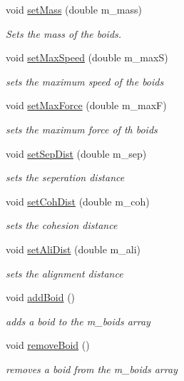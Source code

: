 \begin{DoxyCompactItemize}
\item 
void \hyperlink{classBoidManager_a68e8db68ff75e9d85f6dcba93034d2cb}{setMass} (double m\_\-mass)
\begin{DoxyCompactList}\small\item\em Sets the mass of the boids. \end{DoxyCompactList}\item 
void \hyperlink{classBoidManager_af6fde83bd957cf0670a6e35224806f16}{setMaxSpeed} (double m\_\-maxS)
\begin{DoxyCompactList}\small\item\em sets the maximum speed of the boids \end{DoxyCompactList}\item 
void \hyperlink{classBoidManager_ab7bc38a47f17a7c3250d7ee9eaa5bd3f}{setMaxForce} (double m\_\-maxF)
\begin{DoxyCompactList}\small\item\em sets the maximum force of th boids \end{DoxyCompactList}\item 
void \hyperlink{classBoidManager_a23eb2208fa6240f9cdf1b13991be2bc5}{setSepDist} (double m\_\-sep)
\begin{DoxyCompactList}\small\item\em sets the seperation distance \end{DoxyCompactList}\item 
void \hyperlink{classBoidManager_a6cfe58d32d79898a5a0b1242533997bd}{setCohDist} (double m\_\-coh)
\begin{DoxyCompactList}\small\item\em sets the cohesion distance \end{DoxyCompactList}\item 
void \hyperlink{classBoidManager_af81a32c698d1691ef0702d82aa285dbd}{setAliDist} (double m\_\-ali)
\begin{DoxyCompactList}\small\item\em sets the alignment distance \end{DoxyCompactList}\item 
\hypertarget{classBoidManager_a7b78aab8b8ffa6b4c6c2553cc67c4e1e}{
void \hyperlink{classBoidManager_a7b78aab8b8ffa6b4c6c2553cc67c4e1e}{addBoid} ()}
\label{classBoidManager_a7b78aab8b8ffa6b4c6c2553cc67c4e1e}

\begin{DoxyCompactList}\small\item\em adds a boid to the m\_\-boids array \end{DoxyCompactList}\item 
\hypertarget{classBoidManager_a7357bfaa9a4fdce0ac929504f5b11cb9}{
void \hyperlink{classBoidManager_a7357bfaa9a4fdce0ac929504f5b11cb9}{removeBoid} ()}
\label{classBoidManager_a7357bfaa9a4fdce0ac929504f5b11cb9}

\begin{DoxyCompactList}\small\item\em removes a boid from the m\_\-boids array \end{DoxyCompactList}\end{DoxyCompactItemize}


